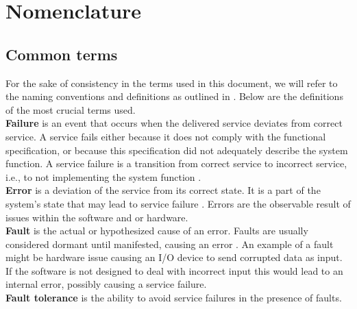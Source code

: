 \section{Nomenclature}

\subsection{Common terms}

For the sake of consistency in the terms used in this document, we will refer to the naming conventions and definitions as outlined in \cite{1335465}. Below are the definitions of the most crucial terms used. \\

\textbf{Failure} is an event that occurs when the delivered service deviates from correct service. A service fails either because it does not comply with the functional specification, or because this specification did not adequately describe the system function. A service failure is a transition from correct service to incorrect service, i.e., to not implementing the system function \cite{1335465}. \\

\textbf{Error} is a deviation of the service from its correct state. It is a part of the system's state that may lead to service failure \cite{1335465}. Errors are the observable result of issues within the software and or hardware. \\

\textbf{Fault} is the actual or hypothesized cause of an error. Faults are usually considered dormant until manifested, causing an error \cite{1335465}. An example of a fault might be hardware issue causing an I/O device to send corrupted data as input. If the software is not designed to deal with incorrect input this would lead to an internal error, possibly causing a service failure. \\

\textbf{Fault tolerance} is the ability to avoid service failures in the presence of faults. 
